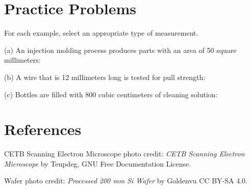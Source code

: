 \documentclass{ximera}
\begin{document}
\section*{Practice Problems}

\begin{problem}\label{prob:lengthAreaVolume}
    For each example, select an appropriate type of measurement.

    (a)	An injection molding process produces parts with an area of 50 square millimeters: 

    (b) A wire that is 12 millimeters long is tested for pull strength: 

    (c)	Bottles are filled with 800 cubic centimeters of cleaning solution: 
\end{problem}

\section*{References}

CETB Scanning Electron Microscope photo credit: \textit{CETB Scanning Electron Microscope} by Teupdeg, GNU Free Documentation License.

Wafer photo credit: \textit{Processed 200 mm Si Wafer} by Goldenvu CC BY-SA 4.0.
\end{document}

